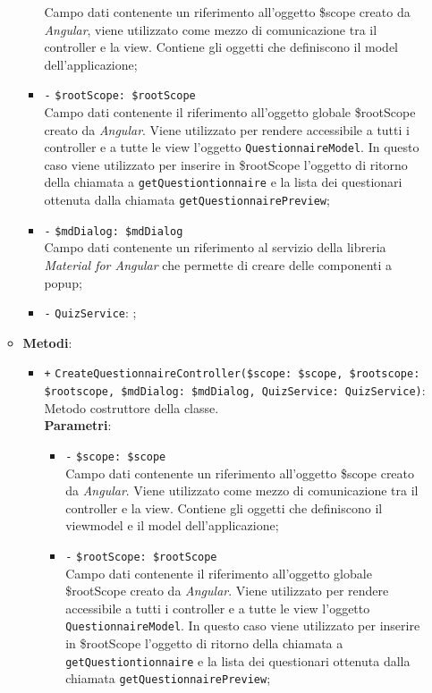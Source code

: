 \begin{itemize}
\begin{itemize}
\begin{itemize}
		Campo dati contenente un riferimento all’oggetto \$scope creato da \textit{Angular}, viene utilizzato come mezzo di comunicazione tra il controller e la view. Contiene gli oggetti che definiscono il model dell’applicazione;
		\item \texttt{-} \texttt{\$rootScope: \$rootScope} \\
		Campo dati contenente il riferimento all'oggetto globale \$rootScope creato da \textit{Angular}. Viene utilizzato per rendere accessibile a tutti i controller e a tutte le view l'oggetto \texttt{QuestionnaireModel}. In questo caso viene utilizzato per inserire in \$rootScope l'oggetto di ritorno della chiamata a \texttt{getQuestiontionnaire} e la lista dei questionari ottenuta dalla chiamata \texttt{getQuestionnairePreview};
		\item \texttt{-} \texttt{\$mdDialog: \$mdDialog} \\
		Campo dati contenente un riferimento al servizio della libreria \textit{Material for Angular} che permette di creare delle componenti a popup;
		\item \texttt{-} \texttt{QuizService}: ;
	\end{itemize}
	\item \textbf{Metodi}:
	\begin{itemize}
		\item \texttt{+} \texttt{CreateQuestionnaireController(\$scope: \$scope, \$rootscope: \$rootscope, \$mdDialog: \$mdDialog, QuizService: QuizService)}: \\ Metodo costruttore della classe. \\
		\textbf{Parametri}:
		\begin{itemize}
			\item \texttt{-} \texttt{\$scope: \$scope} \\
			Campo dati contenente un riferimento all’oggetto \$scope creato da \textit{Angular}. Viene utilizzato come mezzo di comunicazione tra il controller e la view. Contiene gli oggetti che definiscono il viewmodel e il model dell’applicazione;
				\item \texttt{-} \texttt{\$rootScope: \$rootScope} \\
				Campo dati contenente il riferimento all'oggetto globale \$rootScope creato da \textit{Angular}. Viene utilizzato per rendere accessibile a tutti i controller e a tutte le view l'oggetto \texttt{QuestionnaireModel}. In questo caso viene utilizzato per inserire in \$rootScope l'oggetto di ritorno della chiamata a \texttt{getQuestiontionnaire} e la lista dei questionari ottenuta dalla chiamata \texttt{getQuestionnairePreview};

\end{itemize}
\end{itemize}
\end{itemize}
\end{itemize}
